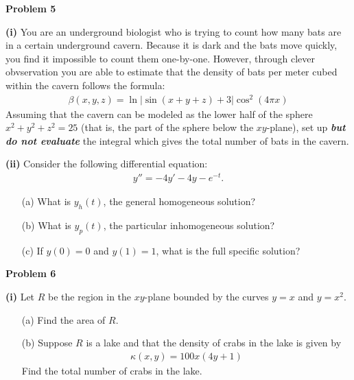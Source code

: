 \documentclass[12pt]{amsbook}
\begin{document}
\textbf{Problem 5}

\vspace{.25cm}

\textbf{(i)} You are an underground biologist who is trying to count how many bats are in a certain underground cavern. Because it is dark and the bats move quickly, you find it impossible to count them one-by-one. However, through clever obvservation you are able to estimate that the density of bats per meter cubed within the cavern follows the formula:
\begin{align*}
\beta(x,y,z) = \ln|\sin(x+y+z)+3|\cos^2(4\pi x)
\end{align*}
Assuming that the cavern can be modeled as the lower half of the sphere $x^2+y^2+z^2 = 25$ (that is, the part of the sphere below the $xy$-plane), set up \emph{\textbf{but do not evaluate}} the integral which gives the total number of bats in the cavern.





\vspace{6cm}


\textbf{(ii)} Consider the following differential equation:
\begin{align*}
y'' = -4y' - 4y - e^{-t}.
\end{align*}
\begin{itemize}
\item[(a)] What is $y_h(t)$, the general homogeneous solution?
\item[(b)] What is $y_p(t)$, the particular inhomogeneous solution?
\item[(c)] If $y(0) = 0$ and $y(1) = 1$, what is the full specific solution?
\end{itemize}






\newpage

\textbf{Problem 6}

\vspace{.25cm}

\textbf{(i)} Let $R$ be the region in the $xy$-plane bounded by the curves $y=x$ and $y = x^2$.
\begin{itemize}
\item[(a)] Find the area of $R$.
\item[(b)] Suppose $R$ is a lake and that the density of crabs in the lake is given by
\begin{align*}
\kappa(x,y) = 100x(4y+1)
\end{align*}
Find the total number of crabs in the lake.
\end{itemize}
\end{document}
